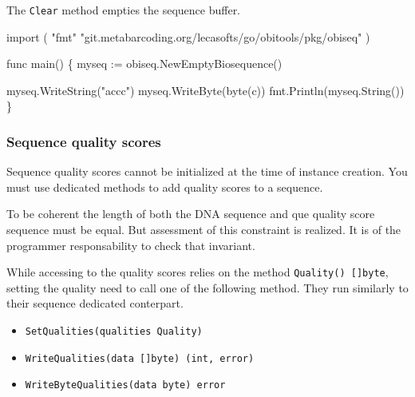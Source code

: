 \documentclass[
  letterpaper,
  DIV=11,
  numbers=noendperiod]{scrreprt}
\newenvironment{Shaded}{\begin{snugshade}}{\end{snugshade}}
\newcommand{\CharTok}[1]{\textcolor[rgb]{0.13,0.47,0.30}{#1}}
\newcommand{\DataTypeTok}[1]{\textcolor[rgb]{0.68,0.00,0.00}{#1}}
\newcommand{\KeywordTok}[1]{\textcolor[rgb]{0.00,0.23,0.31}{#1}}
\newcommand{\NormalTok}[1]{\textcolor[rgb]{0.00,0.23,0.31}{#1}}
\newcommand{\OperatorTok}[1]{\textcolor[rgb]{0.37,0.37,0.37}{#1}}
\newcommand{\StringTok}[1]{\textcolor[rgb]{0.13,0.47,0.30}{#1}}
\providecommand{\tightlist}{%
  \setlength{\itemsep}{0pt}\setlength{\parskip}{0pt}}\usepackage{longtable,booktabs,array}
\begin{document}
The \texttt{Clear} method empties the sequence buffer.

\begin{Shaded}
\begin{Highlighting}[]
\KeywordTok{import} \OperatorTok{(}
    \StringTok{"fmt"}
    \StringTok{"git.metabarcoding.org/lecasofts/go/obitools/pkg/obiseq"}
\OperatorTok{)}

\KeywordTok{func}\NormalTok{ main}\OperatorTok{()} \OperatorTok{\{}
\NormalTok{    myseq }\OperatorTok{:=}\NormalTok{ obiseq}\OperatorTok{.}\NormalTok{NewEmptyBiosequence}\OperatorTok{()}

\NormalTok{    myseq}\OperatorTok{.}\NormalTok{WriteString}\OperatorTok{(}\StringTok{"accc"}\OperatorTok{)}
\NormalTok{    myseq}\OperatorTok{.}\NormalTok{WriteByte}\OperatorTok{(}\DataTypeTok{byte}\OperatorTok{(}\CharTok{\textquotesingle{}c\textquotesingle{}}\OperatorTok{))}
\NormalTok{    fmt}\OperatorTok{.}\NormalTok{Println}\OperatorTok{(}\NormalTok{myseq}\OperatorTok{.}\NormalTok{String}\OperatorTok{())}
\OperatorTok{\}}
\end{Highlighting}
\end{Shaded}

\hypertarget{sequence-quality-scores-1}{%
\subsubsection*{Sequence quality
scores}\label{sequence-quality-scores-1}}

Sequence quality scores cannot be initialized at the time of instance
creation. You must use dedicated methods to add quality scores to a
sequence.

To be coherent the length of both the DNA sequence and que quality score
sequence must be equal. But assessment of this constraint is realized.
It is of the programmer responsability to check that invariant.

While accessing to the quality scores relies on the method
\texttt{Quality()\ {[}{]}byte}, setting the quality need to call one of
the following method. They run similarly to their sequence dedicated
conterpart.

\begin{itemize}
\tightlist
\item
  \texttt{SetQualities(qualities\ Quality)}
\item
  \texttt{WriteQualities(data\ {[}{]}byte)\ (int,\ error)}
\item
  \texttt{WriteByteQualities(data\ byte)\ error}
\end{itemize}
\end{document}
